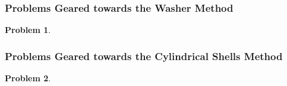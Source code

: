 \documentclass{article}
\newtheorem{problem}{Problem}
\begin{document}
\subsubsection{Problems Geared towards the Washer Method}\label{secMPSvolumesSolidsRevolutionWashers}
\begin{problem}

\end{problem}



\subsubsection{Problems Geared towards the Cylindrical Shells Method}\label{secMPSvolumesSolidsRevolutionShells}
\begin{problem}

\end{problem}
\end{document}

